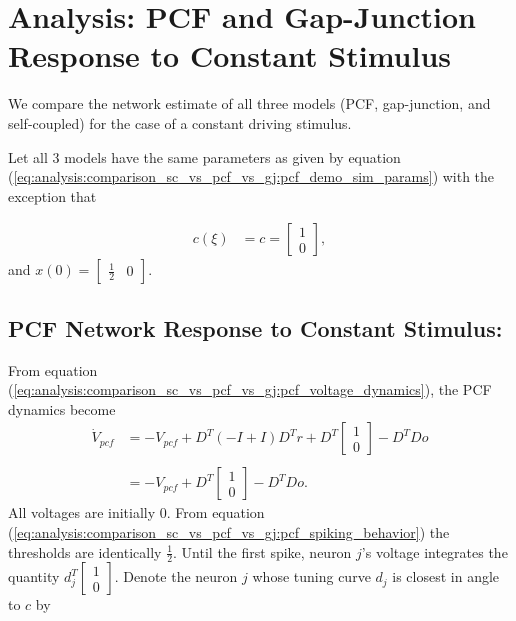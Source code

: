 \section{Analysis: PCF  and Gap-Junction Response to Constant Stimulus}

 We compare the network estimate of all three models (PCF, gap-junction, and self-coupled) for the case of a constant driving stimulus. 
 
 Let all 3 models have the same parameters as given by equation (\ref{eq:analysis:comparison_sc_vs_pcf_vs_gj:pcf_demo_sim_params}) with the exception that 

\begin{align*}
	c(\xi) &= c = 
	\begin{bmatrix}
		1 \\ 0	
	\end{bmatrix}, 
\end{align*}
and
$x(0) = \begin{bmatrix} \frac{1}{2} & 0 \end{bmatrix}$. 
 
 \subsection{PCF Network Response to Constant Stimulus:}

From equation (\ref{eq:analysis:comparison_sc_vs_pcf_vs_gj:pcf_voltage_dynamics}), the PCF dynamics become
\begin{align*}
	\dot{V}_{pcf}
	&=
	- V_{pcf}
	+
	D^T 
	\left(
		-I + I
	\right)
	D^T r
	+
	D^T 
	\begin{bmatrix}
		1 \\ 0
	\end{bmatrix}
	-
	D^T D o
	\\
	\\
	&= 
	-V_{pcf}
	+ 
	D^T 
	\begin{bmatrix}
		1 \\ 0
	\end{bmatrix}
	-
	D^T D o.
\end{align*}
All voltages are initially 0. From equation (\ref{eq:analysis:comparison_sc_vs_pcf_vs_gj:pcf_spiking_behavior}) the thresholds are identically $\frac{1}{2}$. Until the first spike, neuron $j$'s voltage integrates the quantity $d_j^T 	\begin{bmatrix}	1 \\ 0	\end{bmatrix}$. Denote the neuron $j$ whose tuning curve $d_j$ is closest in angle to $c$ by 


